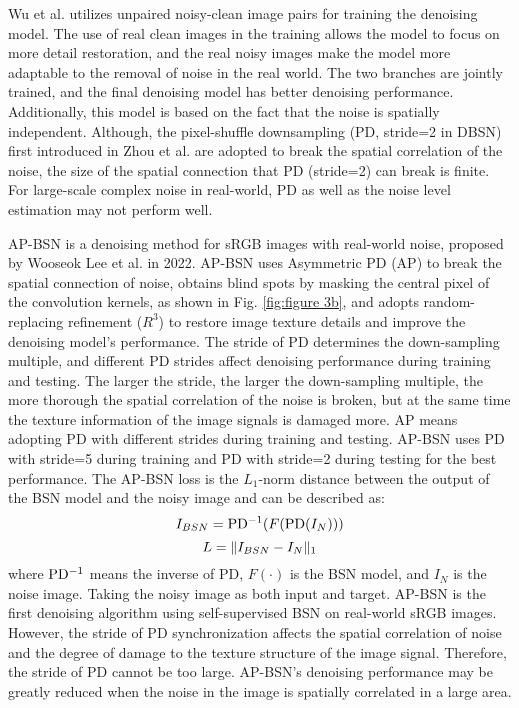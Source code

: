 \documentclass[conference]{IEEEtran}
\begin{document}
Wu et al. \cite{wu2020unpaired} utilizes unpaired noisy-clean image pairs for training the denoising model. The use of real clean images in the training allows the model to focus on more detail restoration, and the real noisy images make the model more adaptable to the removal of noise in the real world. The two branches are jointly trained, and the final denoising model has better denoising performance. Additionally, this model is based on the fact that the noise is spatially independent. Although, the  pixel-shuffle downsampling (PD, stride=2 in DBSN) first introduced in Zhou et al. \cite{zhou2020awgn} are adopted to break the spatial correlation of the noise, the size of the spatial connection that PD (stride=2) can break is finite. For large-scale complex noise in real-world, PD as well as the noise level estimation may not perform well.

AP-BSN \cite{lee2022ap} is a denoising method for sRGB images with real-world noise, proposed by Wooseok Lee et al. in 2022. AP-BSN uses Asymmetric PD (AP) to break the spatial connection of noise, obtains blind spots by masking the central pixel of the convolution kernels, as shown in Fig. \ref{fig:figure 3b}, and adopts random-replacing refinement ($R^3$) to restore image texture details and improve the denoising model's performance.
The stride of PD determines the down-sampling multiple, and different PD strides affect denoising performance during training and testing. The larger the stride, the larger the down-sampling multiple, the more thorough the spatial correlation of the noise is broken, but at the same time the texture information of the image signals is damaged more. AP means adopting PD with different strides during training and testing. AP-BSN uses PD with stride=5 during training and PD with stride=2 during testing for the best performance. 
The AP-BSN loss is the $L_1$-norm distance between the output of the BSN model and the noisy image and can be described as:
\begin{equation}
	\setlength{\abovedisplayskip}{0pt}
	\setlength{\belowdisplayskip}{0pt}
	I_{BSN} = {\rm{PD^{-1}}}(F({\rm{PD}}(I_{N})))
	\label{eq:APBSN_3}
\end{equation}
\begin{equation}
	\setlength{\abovedisplayskip}{0pt}
	\setlength{\belowdisplayskip}{0pt}
	L = \Vert I_{BSN} -I_N \Vert_1
	\label{eq:APBSN_4}
\end{equation}
where $\rm{PD^{-1}}$ means the inverse of PD, $F(\cdot)$ is the BSN model, and $I_{N}$ is the noise image. Taking the noisy image as both input and target. 
AP-BSN is the first denoising algorithm using self-supervised BSN on real-world sRGB images. However, the stride of PD synchronization affects the spatial correlation of noise and the degree of damage to the texture structure of the image signal. Therefore, the stride of PD cannot be too large. AP-BSN's denoising performance may be greatly reduced when the noise in the image is spatially correlated in a large area.
\end{document}

